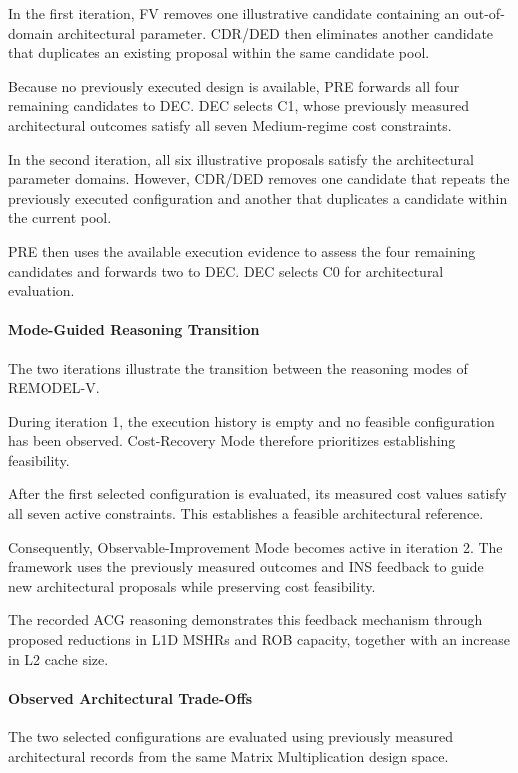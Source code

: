 In the first iteration, FV removes one
illustrative candidate containing an
out-of-domain architectural parameter.
CDR/DED then eliminates another candidate
that duplicates an existing proposal
within the same candidate pool.

Because no previously executed design is
available, PRE forwards all four remaining
candidates to DEC. DEC selects C1, whose
previously measured architectural outcomes
satisfy all seven Medium-regime cost
constraints.

In the second iteration, all six
illustrative proposals satisfy the
architectural parameter domains.
However, CDR/DED removes one candidate
that repeats the previously executed
configuration and another that duplicates
a candidate within the current pool.

PRE then uses the available execution
evidence to assess the four remaining
candidates and forwards two to DEC.
DEC selects C0 for architectural
evaluation.

\paragraph{Mode-Guided Reasoning Transition}

The two iterations illustrate the
transition between the reasoning modes
of REMODEL-V.

During iteration 1, the execution
history is empty and no feasible
configuration has been observed.
Cost-Recovery Mode therefore
prioritizes establishing feasibility.

After the first selected configuration
is evaluated, its measured cost values
satisfy all seven active constraints.
This establishes a feasible
architectural reference.

Consequently, Observable-Improvement
Mode becomes active in iteration 2.
The framework uses the previously
measured outcomes and INS feedback
to guide new architectural proposals
while preserving cost feasibility.

The recorded ACG reasoning demonstrates
this feedback mechanism through proposed
reductions in L1D MSHRs and ROB capacity,
together with an increase in L2 cache size.

\paragraph{Observed Architectural Trade-Offs}

The two selected configurations are
evaluated using previously measured
architectural records from the same
Matrix Multiplication design space.

